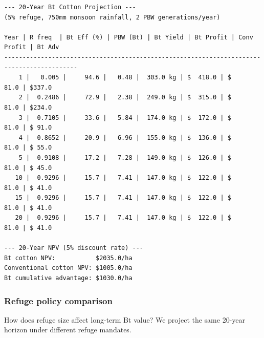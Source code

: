 \begin{verbatim}
--- 20-Year Bt Cotton Projection ---
(5% refuge, 750mm monsoon rainfall, 2 PBW generations/year)

Year | R freq  | Bt Eff (%) | PBW (Bt) | Bt Yield | Bt Profit | Conv Profit | Bt Adv
------------------------------------------------------------------------------------------
    1 |   0.005 |     94.6 |   0.48 |  303.0 kg | $  418.0 | $     81.0 | $337.0
    2 |  0.2486 |     72.9 |   2.38 |  249.0 kg | $  315.0 | $     81.0 | $234.0
    3 |  0.7105 |     33.6 |   5.84 |  174.0 kg | $  172.0 | $     81.0 | $ 91.0
    4 |  0.8652 |     20.9 |   6.96 |  155.0 kg | $  136.0 | $     81.0 | $ 55.0
    5 |  0.9108 |     17.2 |   7.28 |  149.0 kg | $  126.0 | $     81.0 | $ 45.0
   10 |  0.9296 |     15.7 |   7.41 |  147.0 kg | $  122.0 | $     81.0 | $ 41.0
   15 |  0.9296 |     15.7 |   7.41 |  147.0 kg | $  122.0 | $     81.0 | $ 41.0
   20 |  0.9296 |     15.7 |   7.41 |  147.0 kg | $  122.0 | $     81.0 | $ 41.0

--- 20-Year NPV (5% discount rate) ---
Bt cotton NPV:           $2035.0/ha
Conventional cotton NPV: $1005.0/ha
Bt cumulative advantage: $1030.0/ha
\end{verbatim}



\subsubsection{Refuge policy comparison}



\label{15253554457601500412}{}


How does refuge size affect long-term Bt value? We project the same 20-year horizon under different refuge mandates.





